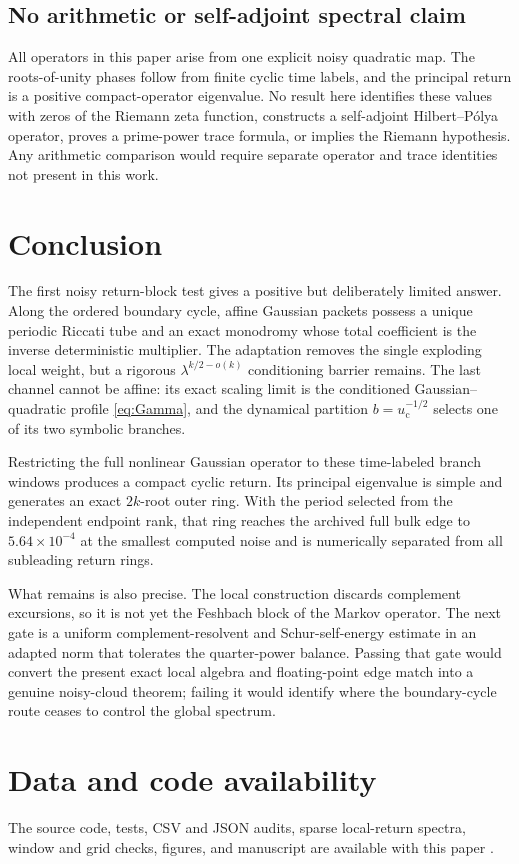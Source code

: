\documentclass[11pt]{article}
\theoremstyle{definition}
\theoremstyle{remark}
\newcommand{\uc}{u_{\mathrm c}}
\begin{document}
\subsection{No arithmetic or self-adjoint spectral claim}

All operators in this paper arise from one explicit noisy quadratic map.
The roots-of-unity phases follow from finite cyclic time labels, and the
principal return is a positive compact-operator eigenvalue.  No result here
identifies these values with zeros of the Riemann zeta function, constructs a
self-adjoint Hilbert--P\'olya operator, proves a prime-power trace formula, or
implies the Riemann hypothesis.  Any arithmetic comparison would require
separate operator and trace identities not present in this work.

\section{Conclusion}

The first noisy return-block test gives a positive but deliberately limited
answer.  Along the ordered boundary cycle, affine Gaussian packets possess a
unique periodic Riccati tube and an exact monodromy whose total coefficient
is the inverse deterministic multiplier.  The adaptation removes the single
exploding local weight, but a rigorous
$\lambda^{k/2-o(k)}$ conditioning barrier remains.  The last channel cannot
be affine: its exact scaling limit is the conditioned Gaussian--quadratic
profile \eqref{eq:Gamma}, and the dynamical partition $b=\uc^{-1/2}$ selects
one of its two symbolic branches.

Restricting the full nonlinear Gaussian operator to these time-labeled branch
windows produces a compact cyclic return.  Its principal eigenvalue is simple
and generates an exact $2k$-root outer ring.  With the period selected from
the independent endpoint rank, that ring reaches the archived full bulk edge
to $5.64\times10^{-4}$ at the smallest computed noise and is numerically
separated from all subleading return rings.

What remains is also precise.  The local construction discards complement
excursions, so it is not yet the Feshbach block of the Markov operator.  The
next gate is a uniform complement-resolvent and Schur-self-energy estimate in
an adapted norm that tolerates the quarter-power balance.  Passing that gate
would convert the present exact local algebra and floating-point edge match
into a genuine noisy-cloud theorem; failing it would identify where the
boundary-cycle route ceases to control the global spectrum.

\section*{Data and code availability}

The source code, tests, CSV and JSON audits, sparse local-return spectra,
window and grid checks, figures, and manuscript are available with this
paper \citep{WangGaussianReturnCode2026}.



\end{document}
